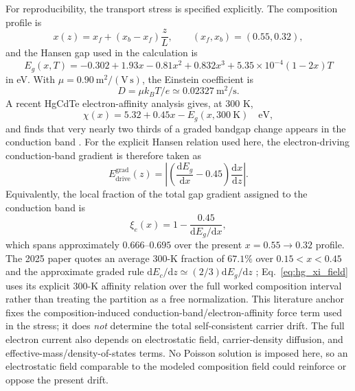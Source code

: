 \documentclass[11pt]{article}
\newcommand{\dd}{\mathrm{d}}
\begin{document}
For reproducibility, the transport stress is specified explicitly. The composition profile is
\begin{equation}
x(z)=x_f+(x_b-x_f)\frac{z}{L},\qquad (x_f,x_b)=(0.55,0.32),
\end{equation}
and the Hansen gap used in the calculation is
\begin{equation}
\boxed{E_g(x,T)=-0.302+1.93x-0.81x^2+0.832x^3+5.35\times10^{-4}(1-2x)T}
\label{eq:hansen_explicit}
\end{equation}
in eV. With $\mu=0.90~\mathrm{m^2/(V\,s)}$, the Einstein coefficient is
\begin{equation}
D=\mu k_BT/e\simeq0.02327~\mathrm{m^2/s}.
\end{equation}
A recent HgCdTe electron-affinity analysis gives, at 300 K,
\begin{equation}
\boxed{\chi(x)=5.32+0.45x-E_g(x,300~\mathrm K)\quad \mathrm{eV},}
\label{eq:hg_affinity}
\end{equation}
and finds that very nearly two thirds of a graded bandgap change appears in the conduction band \cite{RhigerMustafa2025}. For the explicit Hansen relation used here, the electron-driving conduction-band gradient is therefore taken as
\begin{equation}
\boxed{E_{\mathrm{drive}}^{\mathrm{grad}}(z)=\left|\left(\frac{\dd E_g}{\dd x}-0.45\right)\frac{\dd x}{\dd z}\right|.}
\label{eq:hg_xi_field}
\end{equation}
Equivalently, the local fraction of the total gap gradient assigned to the conduction band is
\begin{equation}
\xi_e(x)=1-\frac{0.45}{\dd E_g/\dd x},
\end{equation}
which spans approximately $0.666$--$0.695$ over the present $x=0.55\rightarrow0.32$ profile. The 2025 paper quotes an average 300-K fraction of $67.1\%$ over $0.15<x<0.45$ and the approximate graded rule $\dd E_c/\dd z\simeq(2/3)\dd E_g/\dd z$ \cite{RhigerMustafa2025}; Eq.~\eqref{eq:hg_xi_field} uses its explicit 300-K affinity relation over the full worked composition interval rather than treating the partition as a free normalization. This literature anchor fixes the composition-induced conduction-band/electron-affinity force term used in the stress; it does \emph{not} determine the total self-consistent carrier drift. The full electron current also depends on electrostatic field, carrier-density diffusion, and effective-mass/density-of-states terms. No Poisson solution is imposed here, so an electrostatic field comparable to the modeled composition field could reinforce or oppose the present drift.
\end{document}
